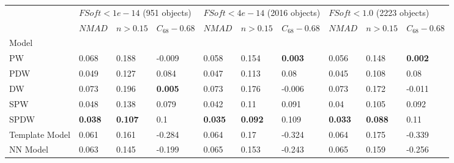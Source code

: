 \documentclass[fleqn,usenatbib]{mnras}
\begin{document}
\begin{table}
	\begin{tabular}{llllllllll}
            \hline
            {} & \multicolumn{3}{l}{$FSoft < 1e-14$ (951 objects)} & \multicolumn{3}{l}{$FSoft < 4e-14$ (2016 objects)} & \multicolumn{3}{l}{$FSoft < 1.0$ (2223 objects)} \\
            {} &                        $NMAD$ &        $n>0.15$ & $C_{68} - 0.68$ &                         $NMAD$ &        $n>0.15$ & $C_{68} - 0.68$ &                       $NMAD$ &        $n>0.15$ & $C_{68} - 0.68$ \\
            Model          &                               &                 &                 &                                &                 &                 &                              &                 &                 \\
            \hline
            PW             &                         0.068 &           0.188 &          -0.009 &                          0.058 &           0.154 &  \textbf{0.003} &                        0.056 &           0.148 &  \textbf{0.002} \\
            PDW            &                         0.049 &           0.127 &           0.084 &                          0.047 &           0.113 &            0.08 &                        0.045 &           0.108 &            0.08 \\
            DW             &                         0.073 &           0.196 &  \textbf{0.005} &                          0.073 &           0.176 &          -0.006 &                        0.073 &           0.172 &          -0.011 \\
            SPW            &                         0.048 &           0.138 &           0.079 &                          0.042 &            0.11 &            0.091 &                         0.04 &           0.105 &            0.092 \\
            SPDW           &                \textbf{0.038} &  \textbf{0.107} &             0.1 &                 \textbf{0.035} &  \textbf{0.092} &           0.109 &               \textbf{0.033} &  \textbf{0.088} &            0.11 \\
            Template Model &                         0.061 &           0.161 &          -0.284 &                          0.064 &            0.17 &          -0.324 &                        0.064 &           0.175 &          -0.339 \\
            NN Model       &                         0.063 &           0.145 &          -0.199 &                          0.065 &           0.153 &          -0.243 &                        0.065 &           0.159 &          -0.256 \\

\end{tabular}
\end{table}
\end{document}
